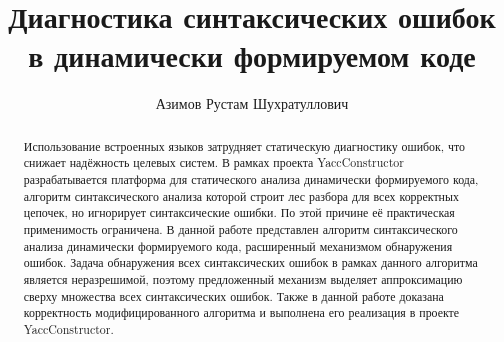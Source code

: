 \title{Диагностика синтаксических ошибок в динамически формируемом коде}


\author{Азимов Рустам Шухратуллович}



\maketitle             

\begin{abstract}
Использование встроенных языков затрудняет статическую диагностику ошибок, что снижает надёжность целевых систем. В рамках проекта YaccConstructor разрабатывается платформа для статического анализа динамически формируемого кода, алгоритм синтаксического анализа которой строит лес разбора для всех корректных цепочек, но игнорирует синтаксические ошибки. По этой причине её практическая применимость ограничена. В данной работе представлен алгоритм синтаксического анализа динамически формируемого кода, расширенный механизмом обнаружения ошибок. Задача обнаружения всех синтаксических ошибок в рамках данного алгоритма является неразрешимой, поэтому предложенный механизм выделяет аппроксимацию сверху множества всех синтаксических ошибок. Также в данной работе доказана корректность модифицированного алгоритма и выполнена его реализация в проекте YaccConstructor.
\end{abstract}
             









